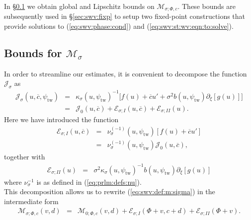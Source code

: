 \documentclass[10pt]{articleHJ}
\newcommand{\s}{\ensuremath{\sigma}}
\newcommand{\sref}[1]{(\ref{#1})}                       %
\numberwithin{equation}{section}
\begin{document}
In \S\ref{sec:swv:bnd:m:sigma} we obtain
global and Lipschitz bounds on
$\mathcal{M}_{\sigma;\Phi, c}$.
These bounds are subsequently
used in \S\ref{sec:swv:fixp} to setup
two fixed-point constructions that
provide solutions
to
\sref{eq:swv:phase:cond}
and \sref{eq:swv:st:wv:eqn:to:solve}.



\subsection{Bounds for $\mathcal{M}_{\sigma}$}
\label{sec:swv:bnd:m:sigma}

In order to streamline our estimates,
it is convenient
to decompose the function
$\mathcal{J}_{\sigma}$
as
\begin{equation}
\begin{array}{lcl}
\mathcal{J}_{\sigma}(u , \overline{c}, \psi_{\mathrm{tw}})
& = &
  \kappa_{\sigma}(u , \psi_{\mathrm{tw}})^{-1}
  \Big[
    f( u )
    + \overline{c} u'
    + \sigma^2 b( u, \psi_{\mathrm{tw}})
      \partial_\xi [g(u )]
  \Big]
\\[0.2cm]
& = &
    \mathcal{J}_0(u, \overline{c})
    + \mathcal{E}_{\sigma; I}(u, \overline{c})
    + \mathcal{E}_{\sigma; II}(u).
\end{array}
\end{equation}
Here we have introduced the function
\begin{equation}
\begin{array}{lcl}
\mathcal{E}_{\sigma;I}(u, \overline{c})
& = &
\nu^{(-1)}_{\sigma}(u, \psi_{\mathrm{tw}}) [f(u) + \overline{c} u']
\\[0.2cm]
& = &
\nu^{(-1)}_{\sigma}(u, \psi_{\mathrm{tw}}) \mathcal{J}_0(u , \overline{c}) ,
\end{array}
\end{equation}
together with
\begin{equation}
\begin{array}{lcl}
\mathcal{E}_{\sigma;II}(u)
& = &
 \sigma^2
 \kappa_{\sigma}(u, \psi_{\mathrm{tw}})^{-1}
 b(u , \psi_{\mathrm{tw}}) \partial_\xi [g(u)]
\end{array}
\end{equation}
where $\nu_\s^{-1}$ is as defined in (\ref{eq:prlm:defs:nu}).\\
This decomposition
allows us to rewrite
\sref{eq:swv:def:m:sigma}
in the intermediate form
\begin{equation}
\begin{array}{lcl}
\mathcal{M}_{\sigma;\Phi, c}(v , d)
& = &
 \mathcal{M}_{0;\Phi, c}
         (v , d)
    + \mathcal{E}_{\sigma;I}(\Phi + v, c+ d)
    + \mathcal{E}_{\sigma;II}(\Phi + v) .
\end{array}
\end{equation}
\end{document}
